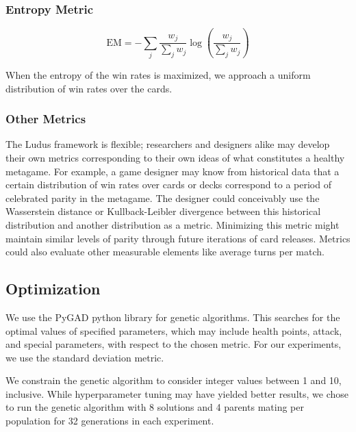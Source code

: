 \documentclass[letterpaper]{article} %
\begin{document}
\subsubsection{Entropy Metric}

\begin{equation}
	\mathrm{EM} = -\sum_j \frac{w_j}{\sum_j w_j} \log\left(\frac{w_j}{\sum_j w_j}\right)
\end{equation}

When the entropy of the win rates is maximized, we approach a uniform
distribution of win rates over the cards.

\subsubsection{Other Metrics} \label{sec:othermetrics}

The {\sc Ludus} framework is flexible; researchers and designers alike may develop their own metrics corresponding to their
own ideas of what constitutes a healthy metagame. For example, a game designer may know from historical data that
a certain distribution of win rates over cards or decks correspond to a period of celebrated parity in the metagame. 
The designer could conceivably use the Wasserstein distance or Kullback-Leibler 
divergence between this historical distribution and another distribution as a metric. Minimizing this metric 
might maintain similar levels of parity through future iterations of card releases.
Metrics could also evaluate other measurable elements like average turns per match.

\subsection{Optimization} \label{sec:optimization}

We use the PyGAD python library \cite{gad2021pygad} for genetic %
algorithms. This searches for the optimal values of
specified parameters, which may include health points, attack, and special parameters, with respect to %
the chosen metric. For our experiments, we use the standard deviation metric.

We constrain the genetic algorithm to consider integer values between 1 and 10, inclusive. While hyperparameter tuning may have yielded better results,
we chose to run the genetic algorithm with 8 solutions and 4 parents mating per population for 32 generations in each experiment.
\end{document}

